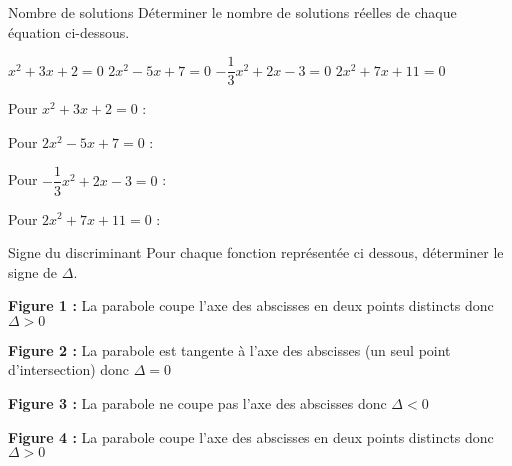 \vspace{-1mm}
\def\rdifficulty{1}
\begin{EXO}{Nombre de solutions}{}
Déterminer le nombre de solutions réelles de chaque équation ci-dessous.
\begin{tcbenumerate}[4]
\tcbitem {} $x^2+3x+2=0$
\tcbitem {} $2x^2-5x+7=0$
\tcbitem {} $-\dfrac{1}{3}x^2+2x-3=0$
\tcbitem {} $2x^2+7x+11=0$ \\
\end{tcbenumerate}

\exocorrection

\begin{tcbenumerate}[1]
\tcbitem Pour $x^2+3x+2=0$ :


\tcbitem Pour $2x^2-5x+7=0$ :


\tcbitem Pour $-\dfrac{1}{3}x^2+2x-3=0$ :


\tcbitem Pour $2x^2+7x+11=0$ :

\end{tcbenumerate}
\end{EXO}

\vspace{-1mm}
\def\rdifficulty{1.5}
\begin{EXO}{Signe du discriminant}{}
Pour chaque fonction représentée ci dessous, déterminer le signe de $\Delta$.

\noindent \begin{minipage}{4cm}
\end{minipage}
\hspace{3mm}
\begin{minipage}{4cm}
\end{minipage}
\hspace{3mm}
\begin{minipage}{4cm}
\end{minipage}
\hspace{3mm}
\begin{minipage}{4cm}
\end{minipage}

\exocorrection

\begin{tcbenumerate}[1]
\tcbitem \textbf{Figure 1 :} La parabole coupe l'axe des abscisses en deux points distincts donc $\Delta > 0$

\tcbitem \textbf{Figure 2 :} La parabole est tangente à l'axe des abscisses (un seul point d'intersection) donc $\Delta = 0$

\tcbitem \textbf{Figure 3 :} La parabole ne coupe pas l'axe des abscisses donc $\Delta < 0$

\tcbitem \textbf{Figure 4 :} La parabole coupe l'axe des abscisses en deux points distincts donc $\Delta > 0$
\end{tcbenumerate}
\end{EXO}

